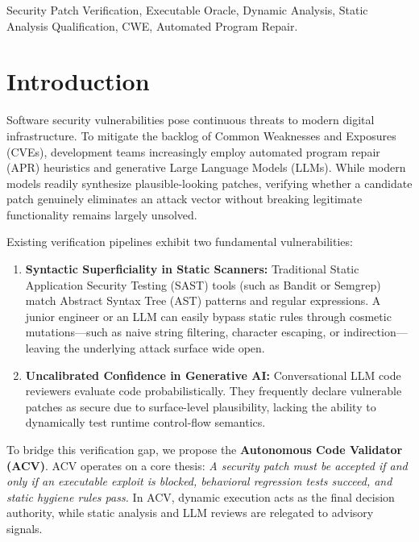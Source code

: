 \documentclass[conference]{IEEEtran}
\begin{document}
\begin{IEEEkeywords}
Security Patch Verification, Executable Oracle, Dynamic Analysis, Static Analysis Qualification, CWE, Automated Program Repair.
\end{IEEEkeywords}

\section{Introduction}
Software security vulnerabilities pose continuous threats to modern digital infrastructure. To mitigate the backlog of Common Weaknesses and Exposures (CVEs), development teams increasingly employ automated program repair (APR) heuristics and generative Large Language Models (LLMs). While modern models readily synthesize plausible-looking patches, verifying whether a candidate patch genuinely eliminates an attack vector without breaking legitimate functionality remains largely unsolved.

Existing verification pipelines exhibit two fundamental vulnerabilities:
\begin{enumerate}
    \item \textbf{Syntactic Superficiality in Static Scanners:} Traditional Static Application Security Testing (SAST) tools (such as Bandit or Semgrep) match Abstract Syntax Tree (AST) patterns and regular expressions. A junior engineer or an LLM can easily bypass static rules through cosmetic mutations---such as naive string filtering, character escaping, or indirection---leaving the underlying attack surface wide open.
    \item \textbf{Uncalibrated Confidence in Generative AI:} Conversational LLM code reviewers evaluate code probabilistically. They frequently declare vulnerable patches as secure due to surface-level plausibility, lacking the ability to dynamically test runtime control-flow semantics.
\end{enumerate}

To bridge this verification gap, we propose the \textbf{Autonomous Code Validator (ACV)}. ACV operates on a core thesis: \textit{A security patch must be accepted if and only if an executable exploit is blocked, behavioral regression tests succeed, and static hygiene rules pass.} In ACV, dynamic execution acts as the final decision authority, while static analysis and LLM reviews are relegated to advisory signals.
\end{document}
